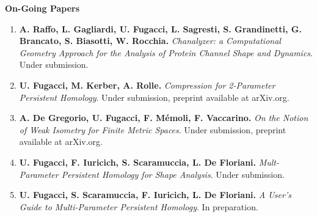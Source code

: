 \documentclass[11pt]{article}
\begin{document}
\noindent
{\bf On-Going Papers}
\begin{enumerate}

\item{\bf A. Raffo, L. Gagliardi, U. Fugacci, L. Sagresti, S. Grandinetti, G. Brancato, S. Biasotti, W. Rocchia.} {\em Chanalyzer: a Computational Geometry Approach for the Analysis of Protein Channel Shape and Dynamics}. Under submission.

\item{\bf U. Fugacci, M. Kerber, A. Rolle.} {\em Compression for 2-Parameter Persistent Homology}. Under submission, preprint available at arXiv.org.

\item {\bf A. De Gregorio, U. Fugacci, F. M\'emoli, F. Vaccarino.} {\em On the Notion of Weak Isometry for Finite Metric Spaces}. Under submission, preprint available at arXiv.org.

\item {\bf U. Fugacci, F. Iuricich, S. Scaramuccia, L. De Floriani.} {\em Mult-Parameter Persistent Homology for Shape Analysis}. Under submission.

\item{\bf U. Fugacci, S. Scaramuccia, F. Iuricich, L. De Floriani.} {\em A User's Guide to Multi-Parameter Persistent Homology}. In preparation.





%
%
%
%
%




\end{enumerate}
\end{document}
